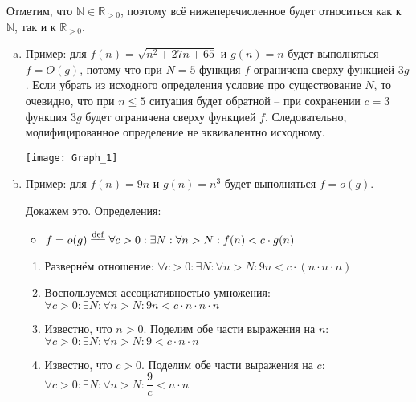 \begin{solution}
    \leavevmode\vspace{1pt}

    Отметим, что $\mathbb{N} \in \mathbb{R}_{>0}$, поэтому всё нижеперечисленное будет относиться как к $\mathbb{N}$, так и к $\mathbb{R}_{>0}$.

    \begin{enumerate}[(a)]
        \item Пример: для $f(n) = \sqrt{n^2 + 27n + 65}$ и $g(n) = n$ будет выполняться $f = O(g)$, потому что при $N = 5$ функция $f$ ограничена сверху функцией $3g$.
            Если убрать из исходного определения условие про существование $N$, то очевидно, что при $n \le 5$ ситуация будет обратной -- при сохранении $c = 3$ функция $3g$ будет ограничена сверху функцией $f$.
            Следовательно, модифицированное определение не эквивалентно исходному.

            \texttt{[image: Graph\_1]}

        \item Пример: для $f(n) = 9n$ и $g(n) = n^3$ будет выполняться $f = o(g)$.

            Докажем это. Определения:

            \begin{itemize}
                \item $f = o(g) \defeq \forall c > 0 : \exists N : \forall n > N : f(n) < c \cdot g(n)$
            \end{itemize}

            \begin{enumerate}[1.]
                \item Развернём отношение:
                    \hfill \break
                    $\forall c > 0 : \exists N : \forall n > N : 9n < c \cdot (n \cdot n \cdot n)$

                \item Воспользуемся ассоциативностью умножения:
                    \hfill \break
                    $\forall c > 0 : \exists N : \forall n > N : 9n < c \cdot n \cdot n \cdot n$

                \item Известно, что $n > 0$. Поделим обе части выражения на $n$:
                    \hfill \break
                    $\forall c > 0 : \exists N : \forall n > N : 9 < c \cdot n \cdot n$

                \item Известно, что $c > 0$. Поделим обе части выражения на $c$:
                    \hfill \break
                    $\forall c > 0 : \exists N : \forall n > N : \dfrac{9}{c} < n \cdot n$


\end{enumerate}
\end{enumerate}
\end{solution}
